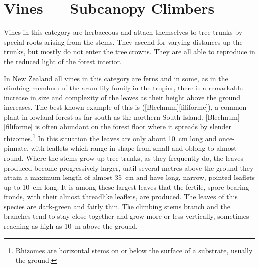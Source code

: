 \section{Vines --- Subcanopy Climbers}

Vines in this category are herbaceous and attach themselves to tree trunks by special roots arising from the stems.
They ascend for varying distances up the trunks, but mostly do not enter the tree crowns.
They are all able to reproduce in the reduced light of the forest interior.

In New Zealand all vines in this category are ferns and in some, as in the climbing members of the arum lily family in the tropics, there is a remarkable increase in size and complexity of the leaves as their height above the ground increases.
The best known example of this is  ([Blechnum][filiforme]), a common plant in lowland forest as far south as the northern South Island.
[Blechnum][filiforme] is often abundant on the forest floor where it spreads by slender rhizomes.\footnote{Rhizomes are horizontal stems on or below the surface of a substrate, usually the ground.}
In this situation the leaves are only about \SI{10}{\centi\metre} long and once-pinnate, with leaflets which range in shape from small and oblong to almost round.
Where the stems grow up tree trunks, as they frequently do, the leaves produced become progressively larger, until several metres above the ground they attain a maximum length of almost \SI{35}{\centi\metre} and have long, narrow, pointed leaflets up to \SI{10}{\centi\metre} long.
It is among these largest leaves that the fertile, spore-bearing fronds, with their almost threadlike leaflets, are produced.
The leaves of this species are dark-green and fairly thin.
The climbing stems branch and the branches tend to stay close together and grow more or less vertically, sometimes reaching as high as \SI{10}{\metre} above the ground.

